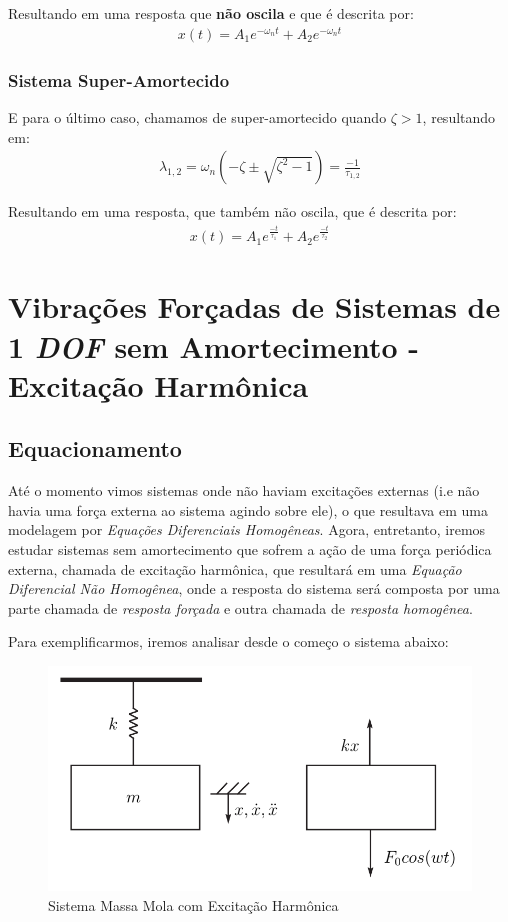 \documentclass{article}
\begin{document}
Resultando em uma resposta que \textbf{não oscila} e que é descrita por:
\begin{align}
    x(t) = A_1 e^{-\omega_n t}  + A_2 e^{-\omega_n t}
\end{align}

\subsubsection{Sistema Super-Amortecido}
E para o último caso, chamamos de super-amortecido quando $\zeta > 1$, resultando em:
\begin{align}
    \lambda_{1,2} = \omega_n\left(-\zeta\pm \sqrt{\zeta^2 - 1}\right) = \frac{-1}{\tau_{1,2}}
\end{align}

Resultando em uma resposta, que também não oscila, que é descrita por:
\begin{align}
    x(t) = A_1e^{\frac{-t}{\tau_1}} + A_2e^{\frac{-t}{\tau_2}}
\end{align}

\section{Vibrações Forçadas de Sistemas de 1 \emph{DOF} sem Amortecimento - Excitação Harmônica}

\subsection{Equacionamento}
Até o momento vimos sistemas onde não haviam excitações externas (i.e não havia uma força externa ao sistema agindo sobre ele), o que resultava em uma modelagem por \emph{Equações
    Diferenciais Homogêneas}. Agora, entretanto, iremos estudar sistemas sem amortecimento que sofrem a ação de uma força periódica externa, chamada de excitação harmônica, que resultará em uma
\emph{Equação Diferencial Não Homogênea}, onde a resposta do sistema será composta por uma parte chamada de \emph{resposta forçada} e outra chamada de \emph{resposta homogênea}.

Para exemplificarmos, iremos analisar desde o começo o sistema abaixo:
\begin{figure}[h]
    \centering
    \includegraphics[width=.5\textwidth]{imgs/sis_massa_mola_harmo.png}
    \caption{Sistema Massa Mola com Excitação Harmônica}
    \label{fig:sis_massa_mola_exci_armonica}
\end{figure}
\end{document}
